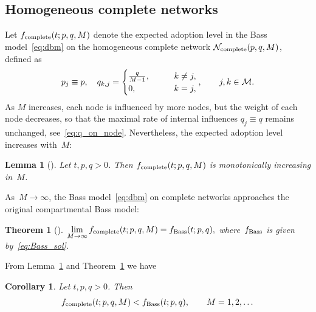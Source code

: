 \documentclass[review]{elsarticle}
\newtheorem{theorem}{Theorem}
\newtheorem{lemma}{Lemma}
\newtheorem{corollary}{Corollary}
\begin{document}
\subsection{Homogeneous complete networks}

Let $f_{\rm complete}(t;p,q,M)$ denote the expected adoption level  in the  Bass model~\eqref{eq:dbm} on the homogeneous complete network ${\cal N}_{\rm complete}(p,q,M)$, defined as 
\begin{equation}
	\label{eq:comp_net}
	p_j \equiv  p, \quad q_{k,j}=\begin{cases}
		\frac{q}{M-1}, \qquad &k\neq j,\\
		0, \qquad & k =j,
	\end{cases}, \qquad j,k\in {\cal M}.
\end{equation}
As $M$ increases, each node is influenced by more nodes, 
but the weight of each node decreases, so that the maximal rate of internal influences $q_j \equiv q$  remains unchanged, see~\eqref{eq:q_on_node}. 
Nevertheless, the expected adoption level increases with~$M$: 
\begin{lemma}[\cite{Bass-monotone-convergence-23}]
	\label{lem:f_complete-monotone-in-M}
	Let $t,p,q>0$. Then $f_{\rm complete}(t;p,q,M)$ is monotonically increasing 
	in~$M$.
\end{lemma}
As~$ M \to \infty$, the  Bass model~\eqref{eq:dbm} on complete networks
approaches the original compartmental Bass model:
\begin{theorem}[\cite{Niu-02}]
	\label{thrm:Niu}
	$
	\lim\limits_{M\rightarrow \infty} f_{\rm complete}(t;p,q,M) = f_{\rm Bass}(t;p,q),
	$
	where~$f_{\rm Bass}$ is given by~\eqref{eq:Bass_sol}.
\end{theorem}
     From Lemma~\ref{lem:f_complete-monotone-in-M} and Theorem~\ref{thrm:Niu} we have
\begin{corollary}
	\label{cor:f_complete<f_Bass}
	Let $t,p,q>0$. Then 
	\begin{equation*}
		\label{eq:f_complete<f_Bass}
		f_{\rm complete}(t;p,q,M)< f_{\rm Bass}(t;p,q), \qquad  M = 1,2, \dots
	\end{equation*} 
\end{corollary}


\end{document}
